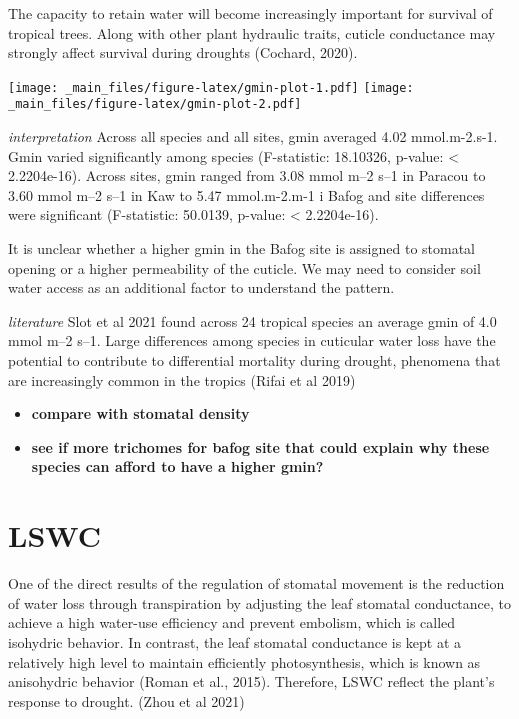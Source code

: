 \documentclass[
]{book}
\providecommand{\tightlist}{%
  \setlength{\itemsep}{0pt}\setlength{\parskip}{0pt}}
\begin{document}
The capacity to retain water will become increasingly important for survival of tropical trees. Along with other plant hydraulic traits, cuticle conductance may strongly affect survival during droughts (Cochard, 2020).

\texttt{[image: \_main\_files/figure-latex/gmin-plot-1.pdf]} \texttt{[image: \_main\_files/figure-latex/gmin-plot-2.pdf]}

\emph{interpretation} Across all species and all sites, gmin averaged 4.02 mmol.m-2.s-1. Gmin varied significantly among species (F-statistic: 18.10326, p-value: \textless{} 2.2204e-16). Across sites, gmin ranged from 3.08 mmol m--2 s--1 in Paracou to 3.60 mmol m--2 s--1 in Kaw to 5.47 mmol.m-2.m-1 i Bafog and site differences were significant (F-statistic: 50.0139, p-value: \textless{} 2.2204e-16).

It is unclear whether a higher gmin in the Bafog site is assigned to stomatal opening or a higher permeability of the cuticle. We may need to consider soil water access as an additional factor to understand the pattern.

\emph{literature} Slot et al 2021 found across 24 tropical species an average gmin of 4.0 mmol m--2 s--1. Large differences among species in cuticular water loss have the potential to contribute to differential mortality during drought, phenomena that are increasingly common in the tropics (Rifai et al 2019)

\begin{itemize}
\tightlist
\item
  \textbf{compare with stomatal density}
\item
  \textbf{see if more trichomes for bafog site that could explain why these species can afford to have a higher gmin?}
\end{itemize}

\hypertarget{lswc}{%
\section{LSWC}\label{lswc}}

One of the direct results of the regulation of stomatal movement is the reduction of water loss through transpiration by adjusting the leaf stomatal conductance, to achieve a high water-use efficiency and prevent embolism, which is called isohydric behavior. In contrast, the leaf stomatal conductance is kept at a relatively high level to maintain efficiently photosynthesis, which is known as anisohydric behavior (Roman et al., 2015). Therefore, LSWC reflect the plant's response to drought. (Zhou et al 2021)
\end{document}
